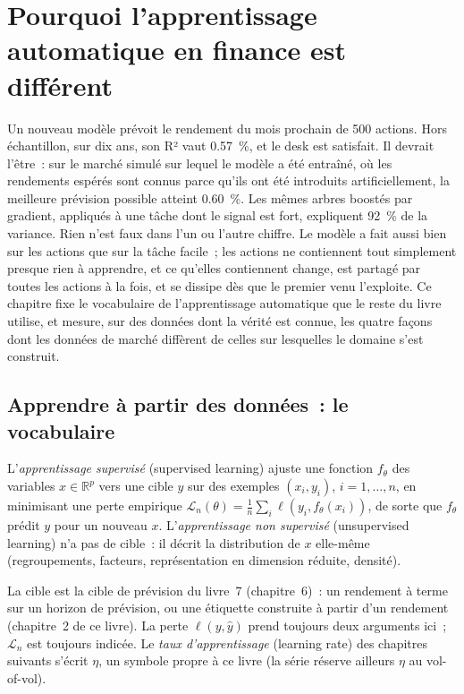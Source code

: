 \chapter{Pourquoi l'apprentissage automatique en finance est différent}\label{ch:ml:why-financial-machine-learning-is-different}

Un nouveau modèle prévoit le rendement du mois prochain de 500 actions. Hors échantillon, sur dix ans, son R² vaut 0.57~\%, et
le desk est satisfait. Il devrait l'être~: sur le marché simulé sur lequel le modèle a été entraîné, où les rendements espérés sont
connus parce qu'ils ont été introduits artificiellement, la meilleure prévision possible atteint 0.60~\%. Les mêmes arbres boostés par gradient,
appliqués à une tâche dont le signal est fort, expliquent 92~\% de la variance. Rien n'est faux dans l'un ou l'autre chiffre. Le modèle
a fait aussi bien sur les actions que sur la tâche facile~; les actions ne contiennent tout simplement presque rien à apprendre, et ce qu'elles
contiennent change, est partagé par toutes les actions à la fois, et se dissipe dès que le premier venu l'exploite. Ce chapitre fixe
le vocabulaire de l'apprentissage automatique que le reste du livre utilise, et mesure, sur des données dont la vérité est connue, les quatre
façons dont les données de marché diffèrent de celles sur lesquelles le domaine s'est construit.

\section{Apprendre à partir des données~: le vocabulaire}

\begin{definition}\label{def:ml:why-financial-machine-learning-is-different:learning}
L'\emph{apprentissage supervisé} (supervised learning) ajuste une fonction $f_\theta$ des variables $x\in\mathbb R^p$ vers
une cible $y$ sur des exemples $(x_i, y_i)$, $i = 1,\dots,n$, en minimisant une perte empirique
$\mathcal L_n(\theta) = \frac1n\sum_i\ell(y_i, f_\theta(x_i))$, de sorte que $f_\theta$ prédit $y$ pour un nouveau $x$.
L'\emph{apprentissage non supervisé} (unsupervised learning) n'a pas de cible~: il décrit la distribution de $x$ elle-même
(regroupements, facteurs, représentation en dimension réduite, densité).
\end{definition}

La cible est la cible de prévision du livre~7 (chapitre~6)~: un rendement à terme sur un horizon de prévision, ou une étiquette construite à partir
d'un rendement (chapitre~2 de ce livre). La perte $\ell(y,\hat y)$ prend toujours deux
arguments ici~; $\mathcal L_n$ est toujours indicée. Le \emph{taux d'apprentissage} (learning rate) des chapitres suivants s'écrit $\eta$,
un symbole propre à ce livre (la série réserve ailleurs $\eta$ au vol-of-vol).

